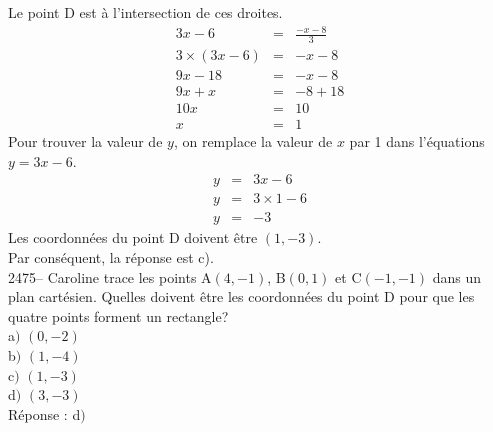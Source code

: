 \documentclass[letterpaper, 12pt]{article}
\begin{document}
Le point D est \`a l'intersection de ces droites.
\begin{eqnarray*}
 3x-6&=&\frac{-x-8}{3}\\[2mm]
 3\times(3x-6)&=&-x-8\\
 9x-18&=&-x-8\\
 9x+x&=&-8+18\\
 10x&=&10\\
x&=&1
\end{eqnarray*}
Pour trouver la valeur de $y$, on remplace la valeur de $x$ par 1 dans l'\'equations $y=3x-6$.
\begin{eqnarray*}
 y&=&3x-6\\
 y&=&3\times 1-6\\
 y&=&-3
\end{eqnarray*}
Les coordonn\'ees du point D doivent \^etre $(1, -3)$.\\
Par cons\'equent, la r\'eponse est c).\\

2475-- Caroline trace les points A$(4, -1)$, B$(0, 1)$ et C$(-1, -1)$ dans un plan cart\'esien. Quelles doivent \^etre les coordonn\'ees du point D pour que les quatre points forment un rectangle?\\

a$)$ $(0, -2)$\\
b$)$ $(1, -4)$\\
c$)$ $(1, -3)$\\
d$)$ $(3, -3)$\\

R\'eponse : d$)$\\
\end{document}
